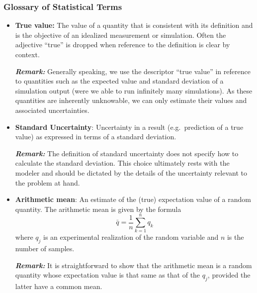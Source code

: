 \subsubsection{Glossary of Statistical Terms}
\begin{itemize}

\item {\bf True value:}  The value of a quantity that is consistent with its definition and is the objective of an idealized measurement or simulation.
Often the adjective ``true'' is dropped when reference to the definition is clear by context. \citep{JCGM:GUM2008,JCGM:VIM2012}
\smallskip

\textbf{\textit{Remark:}} Generally speaking, we use the descriptor ``true value'' in reference to quantities such as the expected value and standard deviation of a simulation output (were we able to run infinitely many simulations).
As these quantities are inherently unknowable, we can only estimate their values and associated uncertainties.

\item {\bf Standard Uncertainty}: Uncertainty in a result (e.g.\ prediction of a true value) as expressed in terms of a standard deviation.
\smallskip 

\textbf{\textit{Remark:}} The definition of standard uncertainty does not specify how to calculate the standard deviation.
This choice ultimately rests with the modeler and should be dictated by the details of the uncertainty relevant to the problem at hand.  

\item {\bf Arithmetic mean}: An estimate of the (true) expectation value of a random quantity. The arithmetic mean is given by the formula
  \begin{equation}
    \bar{q} = \dfrac{1}{n} \sum_{k=1}^{n} q_k \label{def:arith_mean}
  \end{equation}
  where $q_j$ is an experimental realization of the random variable and $n$ is the number of samples. 
\smallskip 

\textbf{\textit{Remark:}} It is straightforward to show that the arithmetic mean is a random quantity whose expectation value is that same as that of the $q_j$, provided the latter have a common mean.


\end{itemize}
